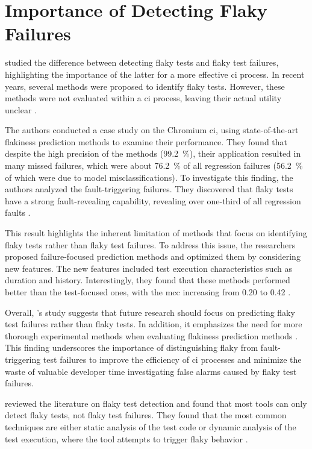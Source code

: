 \section{Importance of Detecting Flaky Failures}
 studied the difference between detecting flaky tests and flaky test failures, highlighting the importance of the latter for a more effective \ac{ci} process.
In recent years, several methods were proposed to identify flaky tests.
However, these methods were not evaluated within a \ac{ci} process, leaving their actual utility unclear \autocite{haben_importance_2023}.

The authors conducted a case study on the Chromium \ac{ci}, using state-of-the-art flakiness prediction methods to examine their performance.
They found that despite the high precision of the methods (\SI{99.2}{\percent}), their application resulted in many missed failures, which were about \SI{76.2}{\percent} of all regression failures (\SI{56.2}{\percent} of which were due to model misclassifications).
To investigate this finding, the authors analyzed the fault-triggering failures. They discovered that flaky tests have a strong fault-revealing capability, revealing over one-third of all regression faults \autocite{haben_importance_2023}.

This result highlights the inherent limitation of methods that focus on identifying flaky tests rather than flaky test failures.
To address this issue, the researchers proposed failure-focused prediction methods and optimized them by considering new features.
The new features included test execution characteristics such as duration and history.
Interestingly, they found that these methods performed better than the test-focused ones, with the \ac{mcc} increasing from \num{0.20} to \num{0.42} \autocite{haben_importance_2023}.

Overall, \citeauthor*{haben_importance_2023}'s study suggests that future research should focus on predicting flaky test failures rather than flaky tests.
In addition, it emphasizes the need for more thorough experimental methods when evaluating flakiness prediction methods \autocite{haben_importance_2023}.
This finding underscores the importance of distinguishing flaky from fault-triggering test failures to improve the efficiency of \ac{ci} processes and minimize the waste of valuable developer time investigating false alarms caused by flaky test failures.

 reviewed the literature on flaky test detection and found that most tools can only detect flaky tests, not flaky test failures.
They found that the most common techniques are either static analysis of the test code or dynamic analysis of the test execution, where the tool attempts to trigger flaky behavior \autocite{rasheed_test_2022}.
